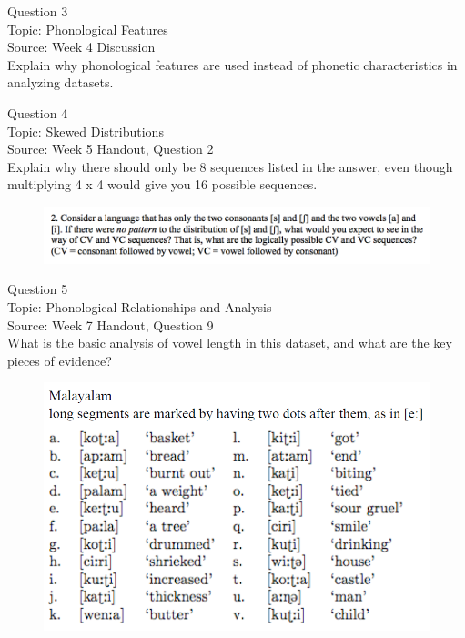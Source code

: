 \documentclass[12pt]{article}
\begin{document}
\newpage

{\large Question 3}\\

Topic: Phonological Features\\
Source: Week 4 Discussion\\

Explain why phonological features are used instead of phonetic characteristics in analyzing datasets.\\


\newpage

{\large Question 4}\\

Topic: Skewed Distributions\\
Source: Week 5 Handout, Question 2\\

Explain why there should only be 8 sequences listed in the answer, even though multiplying 4 x 4 would give you 16 possible sequences.\\

\begin{figure}[H]
\includegraphics{../images/skew2.png}
\end{figure}

\newpage

{\large Question 5}\\

Topic: Phonological Relationships and Analysis\\
Source: Week 7 Handout, Question 9\\

What is the basic analysis of vowel length in this dataset, and what are the key pieces of evidence?\\

\begin{figure}[H]
\includegraphics{../images/malayalam.png}
\end{figure}
\end{document}

